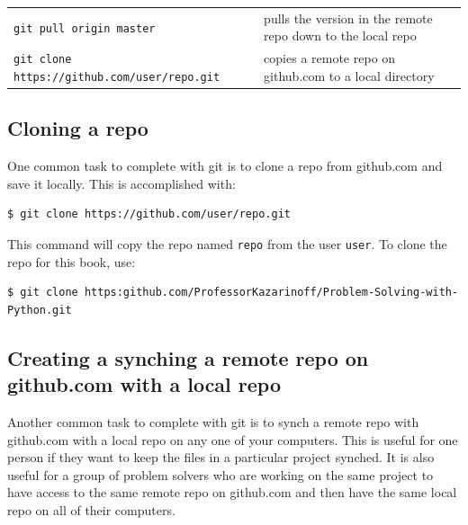 \documentclass{book}
\begin{document}
\begin{longtable}[]{@{}ll@{}}
\begin{minipage}[t]{0.05\columnwidth}
\lstinline!git pull origin master!\strut
\end{minipage} & \begin{minipage}[t]{0.05\columnwidth}\raggedright\strut
pulls the version in the remote repo down to the local repo\strut
\end{minipage}\tabularnewline
\begin{minipage}[t]{0.05\columnwidth}\raggedright\strut
\lstinline!git clone https://github.com/user/repo.git!\strut
\end{minipage} & \begin{minipage}[t]{0.05\columnwidth}\raggedright\strut
copies a remote repo on github.com to a local directory\strut
\end{minipage}\tabularnewline
\bottomrule
\end{longtable}

    \subsection{Cloning a repo}\label{cloning-a-repo}

    One common task to complete with git is to clone a repo from github.com
and save it locally. This is accomplished with:

\begin{lstlisting}
$ git clone https://github.com/user/repo.git
\end{lstlisting}

This command will copy the repo named \lstinline!repo! from the user
\lstinline!user!. To clone the repo for this book, use:

\begin{lstlisting}
$ git clone https:github.com/ProfessorKazarinoff/Problem-Solving-with-Python.git
\end{lstlisting}

    \subsection{Creating a synching a remote repo on github.com with a local
repo}\label{creating-a-synching-a-remote-repo-on-github.com-with-a-local-repo}

    Another common task to complete with git is to synch a remote repo with
github.com with a local repo on any one of your computers. This is
useful for one person if they want to keep the files in a particular
project synched. It is also useful for a group of problem solvers who
are working on the same project to have access to the same remote repo
on github.com and then have the same local repo on all of their
computers.
\end{document}

